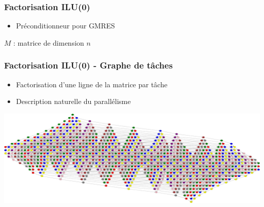 \documentclass{beamer}
\begin{document}
\begin{frame}
  \frametitle{Factorisation ILU(0)}

  \begin{itemize}
    \item Préconditionneur pour GMRES
  \end{itemize}

\begin{algorithm}[H]
\begin{algorithmic}[1]
  \STATE $M$ : matrice de dimension $n$
  \ENDFOR
\end{algorithmic}
\end{algorithm}

\end{frame}


\begin{frame}
  \frametitle{Factorisation ILU(0) - Graphe de tâches}

  \begin{itemize}
    \item Factorisation d'une ligne de la matrice par tâche
    \item Description naturelle du parallélisme
  \end{itemize}

  \centerline{\includegraphics[width=\linewidth]{G1}}
\end{frame}
\end{document}
